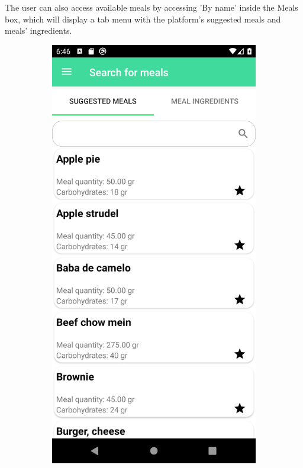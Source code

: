 The user can also access available meals by accessing 'By name' inside the Meals box, which will display a tab menu with the
platform's suggested meals and meals' ingredients.

\begin{figure}[H]
    \captionsetup[subfigure]{justification=centering}
    \begin{center}
        \begin{subfigure}{.3\textwidth}
            \includegraphics[scale=0.1, width=\textwidth]{_figures/suggested_meals.png}

\end{subfigure}
\end{center}
\end{figure}
